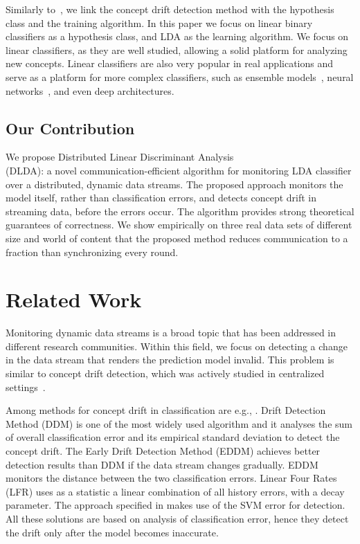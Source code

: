 \documentclass{sig-alternate-05-2015}
\begin{document}
Similarly to~\cite{icml2014c2_harel14}, we link the concept drift detection method with the 
hypothesis class and the training algorithm.  
In this paper we focus on linear binary classifiers as a hypothesis class, and
LDA \cite{fisher1936use} as the learning algorithm. 
We focus on linear classifiers, as they are well studied, allowing a solid platform for analyzing new concepts. Linear classifiers are also very popular in real applications and serve as a platform for more complex classifiers, such as ensemble models~\cite{Deva, eSVM},
neural networks~\cite{osadchy2015k}, and even deep architectures\cite{ROSS}.


\subsection{Our Contribution}
We propose Distributed Linear Discriminant Analysis 
\\ (DLDA): a novel communication-efficient algorithm for monitoring LDA classifier over a distributed, dynamic data streams.
The proposed approach monitors the model itself, rather than classification errors,
and detects concept drift in streaming data, before the errors occur. 
The algorithm provides strong theoretical guarantees of correctness. 
We show empirically on three real data sets of different size and world of content that the proposed 
method reduces communication to a fraction than synchronizing every round.


\section{Related Work}
Monitoring dynamic data streams is a broad topic that has been addressed in different research communities. Within this field, we focus on detecting a change in the data stream that renders the prediction model invalid. This problem is similar to concept drift detection, which was actively studied in centralized settings~\cite{basseville1993detection,brodsky2013nonparametric,ChenGupta2000,Tsymbal,Gama2014}.

Among methods for concept drift in classification are e.g., \cite{gama2004learning,baena2006early,klinkenberg2000detecting,dries2009adaptive,icml2014c2_harel14,AngGZPH13}. Drift Detection Method (DDM) \cite{gama2004learning} is one of the most widely used algorithm and it analyses the sum of overall classification error and its empirical standard deviation to detect the concept drift.
The Early Drift Detection Method (EDDM) \cite{baena2006early} achieves better detection results than DDM if the data stream changes gradually. EDDM monitors the distance between the two classification errors.
Linear Four Rates (LFR) \cite{wang2015concept} uses as a statistic a linear combination of all history errors, with a decay parameter. The approach specified in \cite{klinkenberg2000detecting,dries2009adaptive} makes use of
the SVM error for detection. All these solutions are based on analysis of classification error, hence they detect the drift only after the model becomes inaccurate. 
\end{document}
